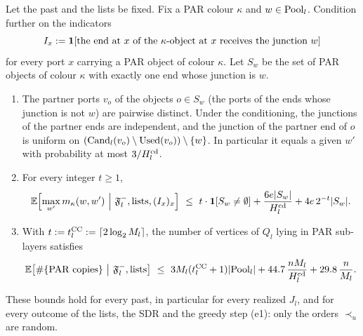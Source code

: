 \begin{lemma}\label{s7:lemCC}
Let the past and the lists be fixed. Fix a PAR colour $\kappa$ and $w\in\mathrm{Pool}_l$.
Condition further on the indicators
\[
I_x\mathrel{:=}\mathbf{1}[\text{the end at $x$ of the $\kappa$-object at $x$ receives the junction }w]
\]
for every port $x$ carrying a PAR object of colour $\kappa$. Let $S_w$ be the
set of PAR objects of colour $\kappa$ with exactly one end whose junction is $w$.
\begin{enumerate}
\item[(i)] The partner ports $v_o$ of the objects $o\in S_w$ (the ports of the
ends whose junction is not $w$) are pairwise distinct. Under the conditioning,
the junctions of the partner ends are independent, and the junction of the
partner end of $o$ is uniform on $(\mathrm{Cand}_l(v_o)\setminus\mathrm{Used}(v_o))\setminus\{w\}$.
In particular it equals a given $w'$ with probability at most $3/H^{\mathrm{cd}}_l$.
\item[(ii)] For every integer $t\ge1$,
\[
\Ex\Bigl[\max_{w'}m_\kappa(w,w')\ \Big|\ \Past_l,\text{lists},(I_x)_x\Bigr]
\ \le\ t\cdot\ind{S_w\ne\emptyset}+\frac{6e|S_w|}{\Hcd_l}+4e\,2^{-t}|S_w| .
\]
\item[(iii)] With $t\mathrel{:=}t^{\mathrm{CC}}_l\mathrel{:=}\lceil2\log_2M_l\rceil$, the number of
vertices of $Q_l$ lying in PAR sub-layers satisfies
\[
\Ex\bigl[\#\{\text{PAR copies}\}\ \big|\ \Past_l,\text{lists}\bigr]\ \le\
3M_l(\tCC_l+1)|\Pool_l|+44.7\,\frac{nM_l}{\Hcd_l}+29.8\,\frac{n}{M_l}.
\]
\end{enumerate}
These bounds hold for every past, in particular for every realized $J_l$, and for
every outcome of the lists, the SDR and the greedy step (e1): only the orders
$\prec_u$ are random.
\deps{\ref{s7:consRound}, \ref{s7:lemWellDef}, \ref{s1:citChernoffGen}, \ref{s6:lemJplus}}
\fixes{\RTb{I4}, \RTa{M2}}
\end{lemma}

